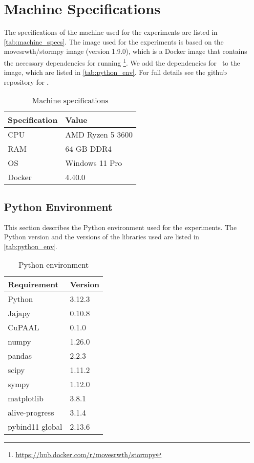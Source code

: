 \section{Machine Specifications}\label{sec:machine_specs}
The specifications of the machine used for the experiments are listed in \autoref{tab:machine_specs}.
The image used for the experiments is based on the movesrwth/stormpy image (version 1.9.0), which is a Docker image that contains the necessary dependencies for running \Jajapy\footnote{\url{https://hub.docker.com/r/movesrwth/stormpy}}.
We add the dependencies for \Cupaal\ to the image, which are listed in \autoref{tab:python_env}.
For full details see the github repository for \Cupaal.

\begin{table}[htb!]
    \centering
    \caption{Machine specifications}
    \label{tab:machine_specs}
    \begin{tabular}{ll}
        \toprule
        Specification & Value            \\
        \midrule
        CPU           & AMD Ryzen 5 3600 \\
        RAM           & 64 GB DDR4       \\
        OS            & Windows 11 Pro   \\
        Docker        & 4.40.0           \\
        \bottomrule
    \end{tabular}
\end{table}

\subsection{Python Environment}\label{subsec:python_env}
This section describes the Python environment used for the experiments. The Python version and the versions of the libraries used are listed in \autoref{tab:python_env}.

\begin{table}[htb!]
    \centering
    \caption{Python environment}
    \label{tab:python_env}
    \begin{tabular}{ll}
        \toprule
        Requirement     & Version \\
        \midrule
        Python          & 3.12.3  \\
        Jajapy          & 0.10.8  \\
        CuPAAL          & 0.1.0   \\
        numpy           & 1.26.0  \\
        pandas          & 2.2.3   \\
        scipy           & 1.11.2  \\
        sympy           & 1.12.0  \\
        matplotlib      & 3.8.1   \\
        alive-progress  & 3.1.4   \\
        pybind11 global & 2.13.6  \\
        \bottomrule
    \end{tabular}
\end{table}